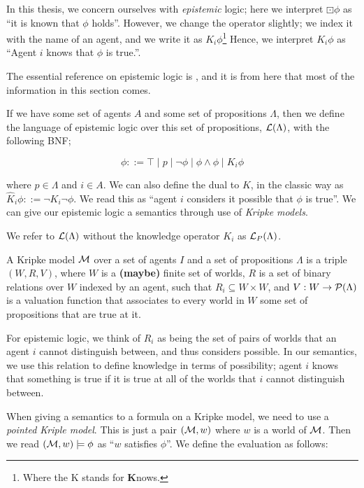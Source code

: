 \documentclass[12pt, a4paper]{article}
\begin{document}
In this thesis, we concern ourselves with \textit{epistemic} logic; here we
interpret $\boxdot \phi$ as ``it is known that $\phi$ holds''. However, we
change the operator slightly; we index it with the name of an agent, and we
write it as $K_i \phi$\footnote{Where the K stands for \textbf{K}nows.} Hence,
we interpret $K_i \phi$ as ``Agent $i$ knows that $\phi$ is true.''.

The essential reference on epistemic logic is \cite{ReasoningAboutKnowledge},
and it is from here that most of the information in this section comes.
  
If we have some set of agents $A$ and some set of propositions $\Lambda$, then
we define the language of epistemic logic over this set of propositions,
$\mathcal{L}(\Lambda)$, with the following BNF;

\begin{equation*}
  \phi ::= \top \mid p \mid \neg \phi \mid \phi \land \phi \mid K_i \phi
\end{equation*}

\noindent where $p \in \Lambda$ and $i \in A$. We can also define the dual to
$K$, in the classic way as $\widehat K_i \phi ::= \neg K_i \neg \phi$. We read
this as ``agent $i$ considers it possible that $\phi$ is true''. We can give our
epistemic logic a semantics through use of \textit{Kripke models}.

We refer to $\mathcal{L}(\Lambda)$ without the knowledge operator $K_i$ as
$\mathcal{L}_P(\Lambda)$.

\bigskip

A Kripke model $\mathcal{M}$ over a set of agents $I$ and a set of propositions
$\Lambda$ is a triple $(W, R, V)$, where $W$ is a \textbf{(maybe)} finite set of
worlds, $R$ is a set of binary relations over $W$ indexed by an agent, such that
$R_i \subseteq W \times W$, and $V : W \rightarrow \mathcal{P}(\Lambda)$ is a
valuation function that associates to every world in $W$ some set of
propositions that are true at it.

For epistemic logic, we think of $R_i$ as being the set of pairs of worlds that
an agent $i$ cannot distinguish between, and thus considers possible. In our
semantics, we use this relation to define knowledge in terms of possibility;
agent $i$ knows that something is true if it is true at all of the worlds that
$i$ cannot distinguish between.

\bigskip

When giving a semantics to a formula on a Kripke model, we need to use a
\textit{pointed Kriple model}. This is just a pair $(\mathcal{M}, w)$ where $w$ is a
world of $\mathcal{M}$. Then we read $(\mathcal{M}, w) \models \phi$ as ``$w$ satisfies
$\phi$''. We define the evaluation as follows:
\end{document}

